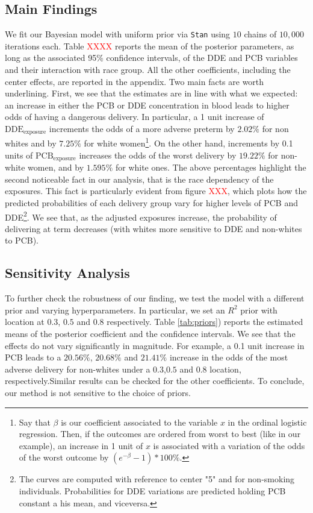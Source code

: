 \documentclass[10pt]{jmlr}%
\newcommand\todo[1]{\textcolor{red}{#1}}
\begin{document}
\subsection{Main Findings}
We fit our Bayesian model with uniform prior via {\tt Stan} using $10$ chains of $10,000$ iterations each. Table \todo{XXXX} reports the mean of the posterior parameters, as long as the associated 95\% confidence intervals, of the DDE and PCB variables and their interaction with race group. All the other coefficients, including the center effects, are reported in the appendix. Two main facts are worth underlining. First, we see that the estimates are in line with what we expected: an increase in either the  PCB or DDE concentration in blood leads to higher odds of having a dangerous delivery. In particular, a 1 unit increase of $\text{DDE}_{\text{exposure}}$ increments the odds of a more adverse preterm by $2.02\%$ for non whites and by $7.25\%$ for white women\footnote{Say that $\beta$ is our coefficient associated to the variable $x$ in the ordinal logistic regression. Then, if the outcomes are ordered from worst to best (like in our example), an increase in 1 unit of $x$ is associated with a variation of the odds of the worst outcome by $(e^{-\beta}-1)*100\%$. }. On the other hand, increments by 0.1 units of $\text{PCB}_{\text{exposure}}$ increases the odds of the worst delivery by $19.22\%$ for non-white women, and by $1.595\%$ for white ones. The above percentages highlight the second noticeable fact in our analysis, that is the race dependency of the exposures. This fact is particularly evident from figure \todo{XXX}, which plots how the predicted probabilities of each delivery group vary for higher levels of PCB and DDE\footnote{The curves are computed with reference to center "5" and for non-smoking individuals. Probabilities for DDE variations are predicted holding PCB constant a his mean, and viceversa.}. We see that, as the adjusted exposures increase, the probability of delivering at term decreases (with whites more sensitive to DDE and non-whites to PCB).

\subsection{Sensitivity Analysis}
To further check the robustness of our finding, we test the model with a different prior and varying hyperparameters. In particular, we set an $R^2$ prior with location at $0.3$, $0.5$ and $0.8$ respectively. Table \ref{tab:priors}) reports the estimated means of the posterior coefficient and the confidence intervals. We see that the effects do not vary significantly in magnitude. For example, a 0.1 unit increase in PCB leads to a $20.56\%$, $20.68\%$ and $21.41\%$  increase in the odds of the most adverse delivery for non-whites under a $0.3$,$0.5$ and $0.8$ location, respectively.Similar results can be checked for the other coefficients. To conclude, our method is not sensitive to the choice of priors.
\end{document}
